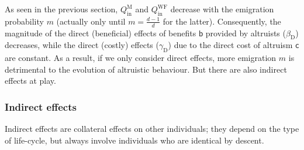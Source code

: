 \documentclass[11pt, letterpaper]{article}
\newcommand{\bb}{\mathsf{b}}
\newcommand{\cc}{\mathsf{c}}
\newcommand{\direct}{\mathrm{D}}
\newcommand{\Moran}{\textrm{M}}
\newcommand{\WF}{\textrm{WF}}
\newcommand{\Qin}{Q_{\textrm{in}}}
\begin{document}
As seen in the previous section, $\Qin^{\Moran}$ and $\Qin^{\WF}$ decrease with the emigration probability $m$ (actually only until $m=\frac{d-1}{d}$ for the latter). Consequently, the magnitude of the direct (beneficial) effects of benefits $\bb$ provided by altruists ($\beta_{\direct}$) decreases, while the direct (costly) effects ($\gamma_{\direct}$) due to the direct cost of altruism $\cc$ are constant. As a result, if we only consider direct effects, more emigration $m$ is detrimental to the evolution of altruistic behaviour. But there are also indirect effects at play. 

\subsubsection{Indirect effects}
Indirect effects are collateral effects on other individuals; they depend on the type of life-cycle, but always involve individuals who are identical by descent. 
\end{document}
